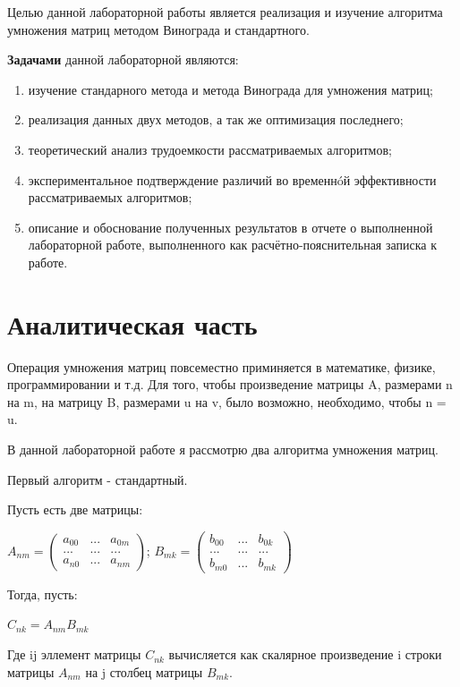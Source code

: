 \documentclass[12pt]{report}
\begin{document}
Целью данной лабораторной работы является реализация и изучение алгоритма умножения матриц методом Винограда и стандартного.

\textbf{Задачами} данной лабораторной являются:
\begin{enumerate}
	\item изучение стандарного метода и метода Винограда для умножения матриц;
	\item реализация данных двух методов, а так же оптимизация последнего;
	\item теоретический анализ трудоемкости рассматриваемых алгоритмов;
	\item экспериментальное подтверждение различий во временнóй эффективности рассматриваемых алгоритмов;
	\item описание и обоснование полученных результатов в отчете о выполненной лабораторной
работе, выполненного как расчётно-пояснительная записка к работе.
\end{enumerate}

\chapter{Аналитическая часть}
Операция умножения матриц повсеместно приминяется в математике, физике, программировании и т.д.
Для того, чтобы произведение матрицы A, размерами n на m, на матрицу B, размерами u на v, было возможно, необходимо, чтобы n = u.

В данной лабораторной работе я рассмотрю два алгоритма умножения матриц.

Первый алгоритм - стандартный. 

Пусть есть две матрицы: 
\begin{center}
{$
A_{nm} = 
\begin{pmatrix}
  a_{00} &  ... & a_{0m}\\
   ... & ... & ...\\
  a_{n0} &  ... &  a_{nm}
\end{pmatrix}
$};
{$
B_{mk} = 
\begin{pmatrix}
  b_{00} &  ... & b_{0k}\\
   ... & ... & ...\\
  b_{m0} &  ... &  b_{mk}
\end{pmatrix}
$}
\end{center}

Тогда, пусть:
\begin{center}
{$
C_{nk} = A_{nm}B_{mk}
$} 
\end{center}
Где ij эллемент матрицы {$C_{nk}$} вычисляется как скалярное произведение i строки матрицы  {$A_{nm}$} на j столбец матрицы {$B_{mk}$}.
\end{document}
